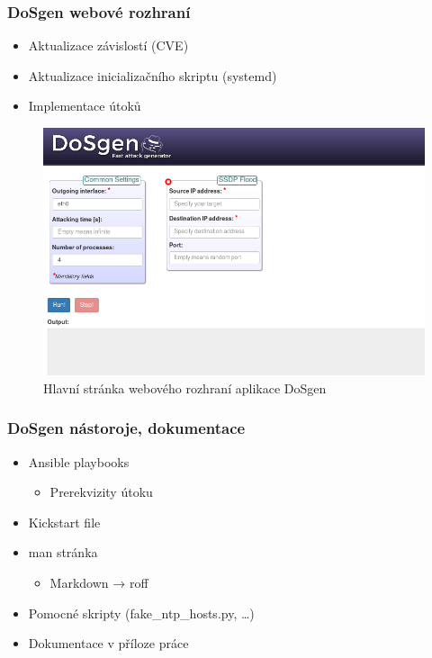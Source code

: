 \documentclass[%
12pt,       				%
t,                  %
aspectratio=1610,   %
unicode,						%
czech,              %
]{beamer}				    	%
\begin{document}
\begin{frame}
\frametitle{DoSgen webové rozhraní}
	\begin{itemize}
		\item Aktualizace závislostí (CVE)
		\item Aktualizace inicializačního skriptu (systemd)
		\item Implementace útoků
	\end{itemize}
	\begin{figure}%
		\centering
		\vspace{0.25cm}	              %
		\includegraphics[width=0.5\columnwidth]{obrazky/dosgen-webui.png}
		\caption{Hlavní stránka webového rozhraní aplikace DoSgen}%
	\end{figure}
\end{frame}


\begin{frame}
\frametitle{DoSgen nástoroje, dokumentace}
\begin{itemize}
\item Ansible playbooks
\begin{itemize}
\item Prerekvizity útoku
\end{itemize}
\item Kickstart file
\item man stránka
\begin{itemize}
\item Markdown → roff
\end{itemize}
\item Pomocné skripty (fake\_ntp\_hosts.py, \dots)
\item Dokumentace v příloze práce
\end{itemize}
\end{frame}

\end{document}
